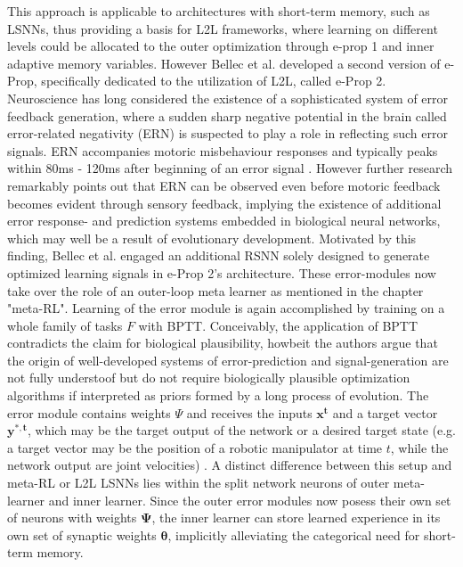\documentclass[letterpaper, 10 pt, conference]{ieeeconf}  %
\begin{document}
This approach is applicable to architectures with short-term memory, such as LSNNs, thus providing a basis for L2L frameworks, where 
learning on different levels could be allocated to the outer optimization through e-prop 1 and inner adaptive memory variables. 
\newline
However Bellec et al. developed a second version of e-Prop, specifically dedicated to the utilization of L2L, called e-Prop 2. 
Neuroscience has long considered the existence of a sophisticated system of error feedback generation, where a sudden sharp 
negative potential in the brain called error-related negativity (ERN) is suspected to play a role in reflecting such error signals.
ERN accompanies motoric misbehaviour responses and typically peaks within 80ms - 120ms after beginning of an error signal 
\cite{gehringErrorRelatedNegativity2018}\cite{dikmanErrorMonitoringReward2000}.
However further research remarkably points out that ERN can be observed even before motoric feedback becomes evident through 
sensory feedback, implying the existence of additional error response- and prediction systems embedded in biological neural networks,
\cite{macleanUsingBrainPotentials2015}
which may well be a result of evolutionary development.
Motivated by this finding, Bellec et al.\cite{bellecBiologicallyInspiredAlternatives2019} engaged an additional 
RSNN solely designed to generate optimized learning signals in e-Prop 2's architecture.
These error-modules now take over the role of an outer-loop meta learner as mentioned in the chapter "meta-RL". Learning of the error module 
is again accomplished by training on a whole family of tasks $F$ with BPTT. Conceivably, the application of BPTT contradicts the claim for 
biological plausibility, howbeit the authors argue that the origin of 
well-developed systems of error-prediction and signal-generation are not fully understoof but do not require biologically plausible optimization 
algorithms if interpreted as priors formed by a long process of evolution. The error module contains weights $\Psi$ and receives the  
inputs $\mathbf{x^t}$ and a target vector $\mathbf{y^{*,t}}$, which may be the target output of the network or a desired target state 
(e.g. a target vector may 
be the position of a robotic manipulator at time $t$, while the network output are joint velocities) \cite{bellecBiologicallyInspiredAlternatives2019}.
A distinct difference 
between this setup and meta-RL or L2L LSNNs lies within the split network neurons of outer meta-learner and inner learner. Since the outer error
modules now posess their own set of neurons with weights $\mathbf{\Psi}$, the inner learner can store learned experience in 
its own set of synaptic weights
$\mathbf{\theta}$, implicitly alleviating the categorical need for short-term memory. \newline
\end{document}
